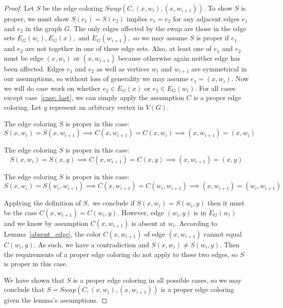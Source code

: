\begin{proof}
    Let $S$ be the edge coloring $Swap(C,(x, w_i), (x, w_{i+1})).$ To show $S$ is proper, we must show $S(e_1) = S(e_2)$ implies $e_1 = e_2$ for any adjacent edges $e_1$ and $e_2$ in the graph $G.$ The only edges affected by the swap are those in the edge sets $E_G(w_i), E_G(x),$ and $E_G(w_{i+1}),$ so we may assume $S$ is proper if $e_1$ and $e_2$ are not together in one of these edge sets. Also, at least one of $e_1$ and $e_2$ must be edge $(x, w_i)$ or $(x, w_{i+1})$ because otherwise again neither edge has been affected. Edges $e_1$ and $e_2$ as well as vertices $w_i$ and $w_{i+1}$ are symmetrical in our assumptions, so without loss of generality we may assume $e_1 = (x, w_i).$ Now we will do case work on whether $e_2 \in E_G(x)$ or $e_2 \in E_G(w_i).$ For all cases except case~\ref{case: last}, we can simply apply the assumption $C$ is a proper edge coloring. Let $y$ represent an arbitrary vertex in $V(G).$ 
    
       The edge coloring $S$ is proper in this case:
        $$S(x, w_i) = S(x, w_{i+1}) \implies C(x, w_{i+1}) = C(x, w_i) \implies (x, w_{i+1}) = (x, w_i)$$
        
        The edge coloring $S$ is proper in this case:
        $$S(x, w_i) = S(x, y) \implies C(x, w_{i+1}) = C(x, y) \implies (x, w_{i+1}) = (x, y)$$
        
        The edge coloring $S$ is proper in this case: 
        $$S(x, w_i) = S(w_i, w_{i+1}) \implies C(x, w_{i+1}) = C(w_i, w_{i+1}) \implies (x, w_{i+1}) = (w_i, w_{i+1})$$
        
    \label{case: last}
        Applying the definition of $S,$ we conclude if $S(x, w_i) = S(w_i, y)$ then it must be the case $C(x, w_{i+1}) = C(w_i, y).$ However, edge $(w_i, y)$ is in $E_G(w_i)$ and we know by assumption $C(x,w_{i+1})$ is absent at $w_i.$ According to Lemma~\ref{absent_edge}, the color $C(x, w_{i+1})$ of edge $(x, w_{i+1})$ cannot equal $C(w_i, y).$ As such, we have a contradiction and $S(x, w_i) \neq S(w_i, y).$ Then the requirements of a proper edge coloring do not apply to these two edges, so $S$ is proper in this case.

    We have shown that $S$ is a proper edge coloring in all possible cases, so we may conclude that $S = Swap(C, (x, w_i), (x, w_{i+1}))$ is a proper edge coloring given the lemma's assumptions.
\end{proof}

